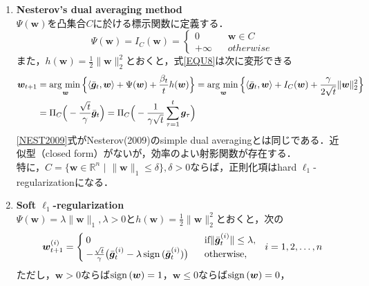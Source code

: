 \documentclass[a4paper,11pt]{jsarticle}
\numberwithin{theorem}{section}  %
\numberwithin{equation}{section} %
\newcommand{\argmin}{\mathop{\rm arg~min\,}\limits}
\newcommand{\sign}{\mathop{\rm sign\,}\limits}
\begin{document}
\begin{enumerate}
\item \textbf{Nesterov's dual averaging method}\\
$\Psi(\bm{w})$を凸集合$C$に於ける標示関数に定義する．
\begin{equation}
\Psi(\bm{w}) = I_C(\bm{w}) = \begin{cases}
0 & \,\,\,\,\, \bm{w} \in C\\
+\infty & \,\,\,\,\, otherwise
\end{cases}
\end{equation}
また，$h(\bm{w}) = \frac{1}{2} \|\bm{w}\|_2^2$とおくと，式\eqref{EQU8}は次に変形できる
\begin{equation}
\begin{split}
\bm{w}_{t+1} &= \argmin_{\bm{w}}\Bigr\{\langle \bar{\bm{g}}_t, \bm{w} \rangle + \Psi(\bm{w}) + \frac{\beta_t}{t} h(\bm{w}) \Bigr\} = \argmin_{\bm{w}}\Bigr\{\langle \bar{\bm{g}}_t, \bm{w} \rangle + I_C(\bm{w}) + \frac{\gamma}{2\sqrt{t}} \| \bm{w} \|_2^2 \Bigr\}\\\
&= \Pi_{C} \Bigr( -\frac{\sqrt{t}}{\gamma}\bar{\bm{g}}_t \Bigr) = \Pi_{C} \Bigr( -\frac{1}{\gamma \sqrt{t}} \sum_{\tau =1}^t \bm{g}_{\tau} \Bigr) \label{NEST2009}
\end{split}
\end{equation}
\eqref{NEST2009}式がNesterov(2009)のsimple dual averagingとは同じである．近似型（closed form）がないが，効率のよい射影関数が存在する．\\
特に，$C=\{\bm{w} \in \mathbb{R}^n \,\,|\,\, \|\bm{w}\|_1 \le \delta \}, \delta > 0$ならば，正則化項はhard $\ell_1$-regularizationになる．
\item
\textbf{Soft $\ell_1$-regularization}\\
$\Psi(\bm{w})=\lambda\|\bm{w}\|_1, \lambda > 0$と$h(\bm{w})=\frac{1}{2} \| \bm{w} \|_2^2$とおくと，次の
\begin{equation}
\bm{w}_{t+1}^{(i)} = \begin{cases}
0 & \,\,\,\, \text{if} \| \bar{\bm{g}}_t^{(i)} \| \le \lambda, \\
-\frac{\sqrt{t}}{\gamma}\bigr( \bar{\bm{g}}_t^{(i)} - \lambda \sign (\bar{\bm{g}}_t^{(i)}) \bigr) & \,\,\,\, \text{otherwise},
\end{cases}\,\,\,\,
i=1,2,\dots,n
\end{equation}
ただし，$\bm{w}>0$ならば$\sign(\bm{w}) = 1$，$\bm{w}\le0$ならば$\sign(\bm{w}) = 0$，
\end{enumerate}
\end{document}
